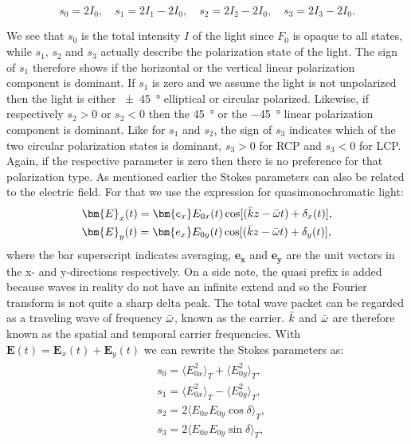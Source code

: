 \begin{equation}
    \label{eq:stokes_param_int}
    s_0 = 2 I_0, \quad 
    s_1 = 2 I_1 - 2 I_0, \quad 
    s_2 = 2 I_2 - 2 I_0, \quad 
    s_3 = 2 I_3 - 2 I_0.
\end{equation}

We see that $s_0$ is the total intensity $I$ of the light since $F_0$ is opaque to all states, while $s_1$, $s_2$ and $s_3$ actually describe the polarization state of the light. The sign of $s_1$ therefore shows if the horizontal or the vertical linear polarization component is dominant. If $s_1$ is zero and we assume the light is not unpolarized then the light is either \SI{\pm 45}{\degree} elliptical or circular polarized. Likewise, if respectively $s_2>0$ or $s_2<0$ then the \SI{45}{\degree} or the \SI{-45}{\degree} linear polarization component is dominant. Like for $s_1$ and $s_2$, the sign of $s_3$ indicates which of the two circular polarization states is dominant, $s_3>0$ for RCP and $s_3<0$ for LCP. Again, if the respective parameter is zero then there is no preference for that polarization type. As mentioned earlier the Stokes parameters can also be related to the electric field. For that we use the expression for quasimonochromatic light:
\begin{align}
\begin{split}
    \label{eq:quasi_mono_efields}
    &\bm{E}_x(t) = \bm{e_x}E_{0x}(t)\cos [(\Bar{k}z-\Bar{\omega} t) + \delta_x(t)], \\
    &\bm{E}_y(t) = \bm{e_x}E_{0y}(t)\cos [(\Bar{k}z-\Bar{\omega} t) + \delta_y(t)],
\end{split}
\end{align}
where the bar superscript indicates averaging, $\bm{e_x}$ and $\bm{e_y}$ are the unit vectors in the x- and y-directions respectively. On a side note, the quasi prefix is added because waves in reality do not have an infinite extend and so the Fourier transform is not quite a sharp delta peak. The total wave packet can be regarded as a traveling wave of frequency $\Bar{\omega}$, known as the carrier. $\Bar{k}$ and $\Bar{\omega}$ are therefore known as the spatial and temporal carrier frequencies. 
With $\bm{E}(t)=\bm{E}_x(t)+\bm{E}_y(t)$ we can rewrite the Stokes parameters as:
\begin{align}
\begin{split}
    \label{eq:stokes_param_e}
    &s_0 = \langle E_{0x}^2 \rangle_T + \langle E_{0y}^2 \rangle_T, \\
    &s_1 = \langle E_{0x}^2 \rangle_T - \langle E_{0y}^2 \rangle_T, \\
    &s_2 = 2\langle E_{0x}E_{0y}\cos \delta \rangle_T, \\
    &s_3 = 2\langle E_{0x}E_{0y}\sin \delta \rangle_T,
\end{split}
\end{align}
